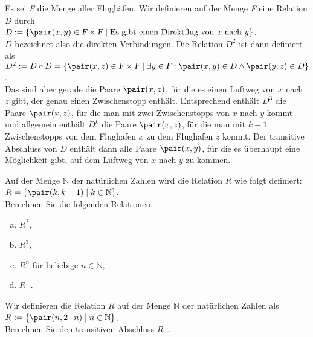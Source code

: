 \example
Es sei \textsl{F} die Menge aller Flugh\"{a}fen.  Wir definieren auf der Menge \textsl{F} eine
Relation \textsl{D} durch
\\[0.2cm]
\hspace*{1.3cm}
$\textsl{D} := \{ \pair(x,y) \in \textsl{F} \times \textsl{F} \mid
                  \mbox{Es gibt einen Direktflug von $x$ nach $y$} \}$.
\\[0.2cm]
$D$ bezeichnet also die direkten Verbindungen.  Die Relation $D^2$ ist dann definiert als
\\[0.2cm]
\hspace*{1.3cm}
$D^2 := D \circ D = \{ \pair(x,z) \in \textsl{F} \times \textsl{F} \mid 
          \exists y \in \textsl{F}: \pair(x,y) \in D \wedge \pair(y,z) \in D \}$.
\\[0.2cm]
Das sind aber gerade die Paare $\pair(x,z)$, f\"{u}r die es einen Luftweg von $x$ nach $z$
gibt, der genau einen Zwischenstopp enth\"{a}lt.  Entsprechend enth\"{a}lt $D^3$ die Paare
$\pair(x,z)$, f\"{u}r die man mit zwei Zwischenstopps von $x$ nach $y$ kommt und allgemein
enth\"{a}lt $D^k$ die Paare $\pair(x,z)$, f\"{u}r die man mit $k-1$ Zwischenstopps von dem
Flughafen $x$ zu dem Flughafen $z$ kommt.
Der transitive Abschluss von $D$ enth\"{a}lt
dann alle Paare $\pair(x,y)$, f\"{u}r die es \"{u}berhaupt eine M\"{o}glichkeit gibt, auf dem Luftweg
von $x$ nach $y$ zu kommen. \eox

\exercise
Auf der Menge $\mathbb{N}$ der nat\"{u}rlichen Zahlen wird die Relation $R$ wie folgt definiert:
\\[0.2cm]
\hspace*{1.3cm}
$R = \{ \pair(k, k + 1) \mid k \in \mathbb{N} \}$.
\\[0.2cm]
Berechnen Sie die folgenden Relationen:
\begin{enumerate}[(a)]
\item $R^2$,
\item $R^3$,
\item $R^n$ f\"{u}r beliebige $n \in \mathbb{N}$,
\item $R^+$. \exend
\end{enumerate}

\exercise
Wir definieren die Relation $R$ auf der Menge $\mathbb{N}$ der nat\"{u}rlichen Zahlen als
\\[0.2cm]
\hspace*{1.3cm}
$R := \{ \pair(n, 2 \cdot n) \mid n \in \mathbb{N} \}$.
\\[0.2cm]
Berechnen Sie den transitiven Abschluss $R^+$.
\exend


